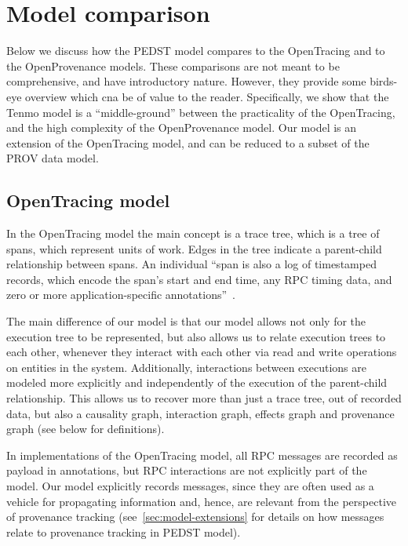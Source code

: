 \section{Model comparison}

Below we discuss how the PEDST model compares to the OpenTracing and to the OpenProvenance models. These comparisons are not meant to be comprehensive, and have introductory nature. However, they provide some birds-eye overview which cna be of value to the reader. Specifically, we show that the Tenmo model is a ``middle-ground'' between the practicality of the OpenTracing, and the high complexity of the OpenProvenance model. Our model is an extension of the OpenTracing model, and can be reduced to a subset of the PROV data model.

\subsection{OpenTracing model}

In the OpenTracing model the main concept is a trace tree, which is a tree of spans, which represent units of work. Edges in the tree indicate a parent-child relationship between spans. An individual ``span is also a log of timestamped records, which encode the span’s start and end time, any RPC timing data, and zero or more application-specific annotations''~\cite[p.3]{dapper2010}.

The main difference of our model is that our model allows not only for the execution tree to be represented, but also allows us to relate execution trees to each other, whenever they interact with each other via read and write operations on entities in the system. Additionally, interactions between executions are modeled more explicitly and independently of the execution of the parent-child relationship. This allows us to recover more than just a trace tree, out of recorded data, but also a causality graph, interaction graph, effects graph and provenance graph (see  below for definitions).

In implementations of the OpenTracing model, all RPC messages are recorded as payload in annotations, but RPC interactions are not explicitly part of the model. Our model explicitly records messages, since they are often used as a vehicle for propagating information and, hence, are relevant from the perspective of provenance tracking (see~\cref{sec:model-extensions} for details on how messages relate to provenance tracking in PEDST model).

